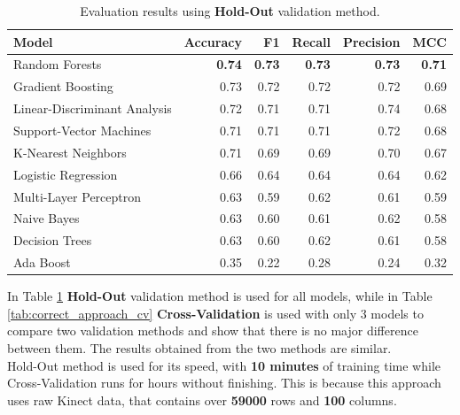                \begin{table}[htbp]
                    \centering
                    \begin{tabular}{lrrrrr}
                        \toprule
                        \textbf{Model} & \textbf{Accuracy} & \textbf{F1} & \textbf{Recall} & \textbf{Precision} & \textbf{MCC} \\
                        \midrule
                        Random Forests & \textbf{0.74} & \textbf{0.73} & \textbf{0.73} & \textbf{0.73} & \textbf{0.71} \\
                        Gradient Boosting & 0.73 & 0.72 & 0.72 & 0.72 & 0.69 \\
                        Linear-Discriminant Analysis & 0.72 & 0.71 & 0.71 & 0.74 & 0.68 \\
                        Support-Vector Machines & 0.71 & 0.71 & 0.71 & 0.72 & 0.68 \\
                        K-Nearest Neighbors & 0.71 & 0.69 & 0.69 & 0.70 & 0.67 \\
                        Logistic Regression & 0.66 & 0.64 & 0.64 & 0.64 & 0.62 \\
                        Multi-Layer Perceptron & 0.63 & 0.59 & 0.62 & 0.61 & 0.59 \\
                        Naive Bayes & 0.63 & 0.60 & 0.61 & 0.62 & 0.58 \\
                        Decision Trees & 0.63 & 0.60 & 0.62 & 0.61 & 0.58 \\
                        Ada Boost & 0.35 & 0.22 & 0.28 & 0.24 & 0.32 \\
                        \bottomrule
                    \end{tabular}
                    \caption{Evaluation results using \textbf{Hold-Out} validation method.}
                    \label{tab:correct_approach_holdout}
                \end{table}

                In Table \ref{tab:correct_approach_holdout} \textbf{Hold-Out} validation method is used for all models, while in Table \ref{tab:correct_approach_cv} \textbf{Cross-Validation} is used with only 3 models to compare two validation methods and show that there is no major difference between them. The results obtained from the two methods are similar. \\

                Hold-Out method is used for its speed, with \textbf{10 minutes} of training time while Cross-Validation runs for hours without finishing. This is because this approach uses raw Kinect data, that contains over \textbf{59000} rows and \textbf{100} columns. 
                
